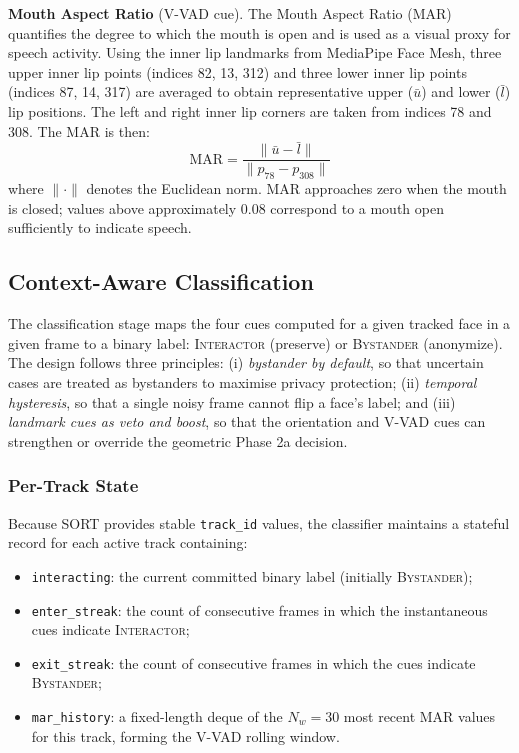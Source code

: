 \textbf{Mouth Aspect Ratio} (V-VAD cue). The Mouth Aspect Ratio (MAR) quantifies the
degree to which the mouth is open and is used as a visual proxy for speech activity.
Using the inner lip landmarks from MediaPipe Face Mesh, three upper inner lip points
(indices 82, 13, 312) and three lower inner lip points (indices 87, 14, 317) are
averaged to obtain representative upper ($\bar{u}$) and lower ($\bar{l}$) lip
positions. The left and right inner lip corners are taken from indices 78 and 308. The
MAR is then:
\begin{equation}
  \mathrm{MAR} = \frac{\lVert \bar{u} - \bar{l} \rVert}
                      {\lVert p_{78} - p_{308} \rVert}
  \label{eq:mar}
\end{equation}
where $\lVert \cdot \rVert$ denotes the Euclidean norm. MAR approaches zero when the
mouth is closed; values above approximately 0.08 correspond to a mouth open sufficiently
to indicate speech.

\subsection{Context-Aware Classification}

The classification stage maps the four cues computed for a given tracked face in a given
frame to a binary label: \textsc{Interactor} (preserve) or \textsc{Bystander}
(anonymize). The design follows three principles: (i) \emph{bystander by default}, so
that uncertain cases are treated as bystanders to maximise privacy protection; (ii)
\emph{temporal hysteresis}, so that a single noisy frame cannot flip a face's label;
and (iii) \emph{landmark cues as veto and boost}, so that the orientation and V-VAD cues
can strengthen or override the geometric Phase 2a decision.

\subsubsection*{Per-Track State}

Because SORT provides stable \texttt{track\_id} values, the classifier maintains a
stateful record for each active track containing:
\begin{itemize}
  \item \texttt{interacting}: the current committed binary label (initially \textsc{Bystander});
  \item \texttt{enter\_streak}: the count of consecutive frames in which the instantaneous
        cues indicate \textsc{Interactor};
  \item \texttt{exit\_streak}: the count of consecutive frames in which the cues indicate
        \textsc{Bystander};
  \item \texttt{mar\_history}: a fixed-length deque of the $N_w = 30$ most recent MAR
        values for this track, forming the V-VAD rolling window.
\end{itemize}

